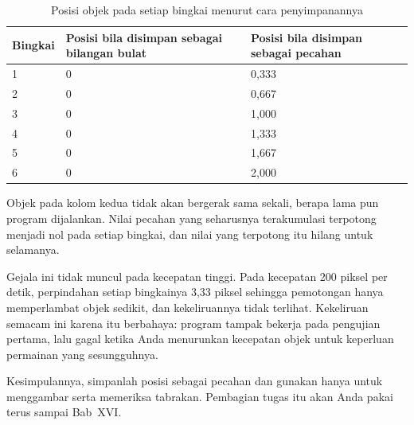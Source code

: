 \begin{table}[htbp]
\centering
\caption{Posisi objek pada setiap bingkai menurut cara penyimpanannya}
\label{tab:posisi-bulat}
{\setlength{\tabcolsep}{4pt}\footnotesize%
\begin{tabularx}{\textwidth}{@{}C{1.6cm} C{3.4cm} Y@{}}
\toprule
\headrow \textbf{Bingkai} & \textbf{Posisi bila disimpan sebagai bilangan bulat} & \textbf{Posisi bila disimpan sebagai pecahan} \\
 & 0 & 0,333 \\
2 & 0 & 0,667 \\
3 & 0 & 1,000 \\
4 & 0 & 1,333 \\
5 & 0 & 1,667 \\
6 & 0 & 2,000 \\
\bottomrule
\end{tabularx}}
\end{table}

Objek pada kolom kedua tidak akan bergerak sama sekali, berapa lama pun
program dijalankan. Nilai pecahan yang seharusnya terakumulasi terpotong
menjadi nol pada setiap bingkai, dan nilai yang terpotong itu hilang untuk
selamanya.

Gejala ini tidak muncul pada kecepatan tinggi. Pada kecepatan 200 piksel per
detik, perpindahan setiap bingkainya 3,33 piksel sehingga pemotongan hanya
memperlambat objek sedikit, dan kekeliruannya tidak terlihat. Kekeliruan
semacam ini karena itu berbahaya: program tampak bekerja pada pengujian
pertama, lalu gagal ketika Anda menurunkan kecepatan objek untuk keperluan
permainan yang sesungguhnya.

Kesimpulannya, simpanlah posisi sebagai pecahan dan gunakan  hanya
untuk menggambar serta memeriksa tabrakan. Pembagian tugas itu akan Anda pakai
terus sampai Bab~XVI.
